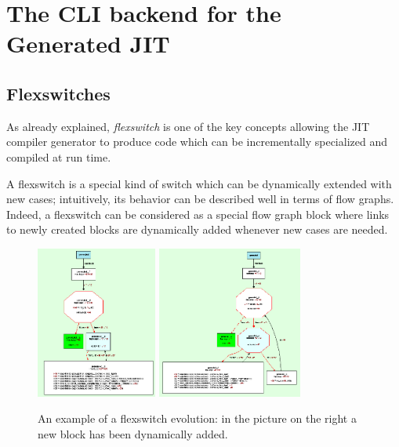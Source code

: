 \section{The CLI backend for the Generated JIT}
\label{sec:clibackend}

%
%
%


\subsection{Flexswitches}

As already explained,  \emph{flexswitch} is one of the key
concepts allowing the JIT compiler generator to produce code which can
be incrementally specialized and compiled at run time.

A flexswitch is a special kind of switch which can be dynamically
extended with new cases; intuitively, its behavior can be described
well in terms of flow graphs. Indeed, a flexswitch can be considered 
as a special flow graph block where links to newly created blocks are
dynamically added whenever new cases are needed. 

\begin{figure}[h]
\begin{center}
\includegraphics[height=5cm]{flexswitch1}
\includegraphics[height=5cm]{flexswitch2}
\caption{An example of a flexswitch evolution: in the picture on the
  right a new block has been dynamically added.}\label{flexswitch-fig}
\end{center}
\end{figure}

